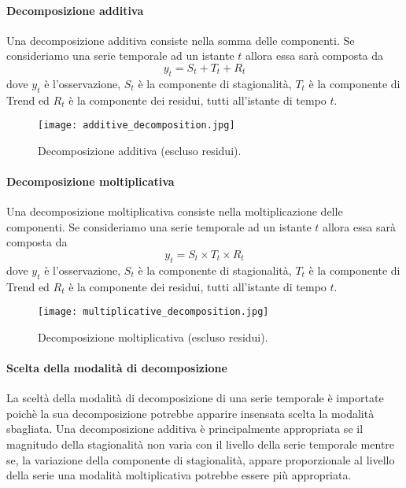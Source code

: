 \paragraph{Decomposizione additiva} 
Una decomposizione additiva consiste nella
somma delle componenti. Se consideriamo una serie temporale ad un 
istante $t$ allora essa sarà composta da
\[ y_t = S_t + T_t + R_t \]
dove $y_t$ è l'osservazione, $S_t$ è la componente di stagionalità, 
$T_t$ è la componente di Trend ed $R_t$ è la componente dei residui, tutti
all'istante di tempo $t$.
\begin{figure}[H]
    \centering
    \texttt{[image: additive\_decomposition.jpg]}
    \caption{Decomposizione additiva (escluso residui).}
\end{figure}


\paragraph{Decomposizione moltiplicativa} 
Una decomposizione moltiplicativa consiste nella
moltiplicazione delle componenti. Se consideriamo una serie temporale ad un 
istante $t$ allora essa sarà composta da
\[ y_t = S_t \times T_t \times R_t \]
dove $y_t$ è l'osservazione, $S_t$ è la componente di stagionalità, 
$T_t$ è la componente di Trend ed $R_t$ è la componente dei residui, tutti
all'istante di tempo $t$.
\begin{figure}[H]
    \centering
    \texttt{[image: multiplicative\_decomposition.jpg]}
    \caption{Decomposizione moltiplicativa (escluso residui).}
\end{figure}

\paragraph{Scelta della modalità di decomposizione}
La sceltà della modalità di decomposizione di una serie temporale è importate poichè
la sua decomposizione potrebbe apparire insensata scelta la modalità sbagliata.
Una decomposizione additiva è principalmente appropriata se il magnitudo della 
stagionalità non varia con il livello della serie temporale mentre se, la variazione
della componente di stagionalità, appare proporzionale al livello della serie una modalità
moltiplicativa potrebbe essere più appropriata.




